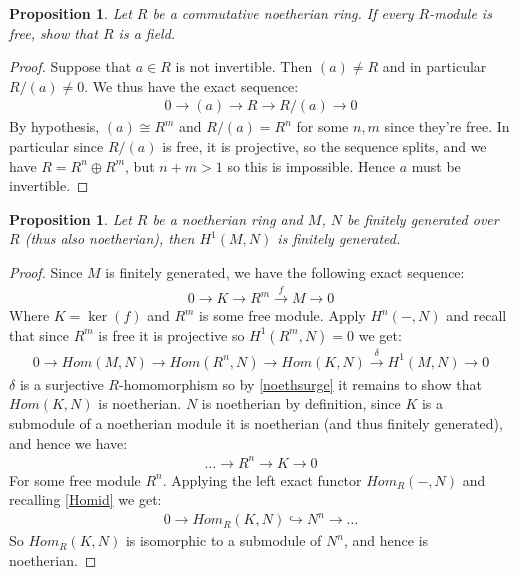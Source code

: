 \documentclass[12pt]{book}
\newtheorem{proposition}[theorem]{Proposition}
\theoremstyle{definition}
\begin{document}
\begin{proposition}
    Let $R$ be a commutative noetherian ring. If every $R$-module is free, show that $R$ is a field. 
\end{proposition}
\begin{proof}
    Suppose that $a \in R$ is not invertible. Then $(a) \neq R$ and in particular $R/(a) \neq 0$. We thus have the exact sequence: 
    \begin{align*}
        0 \rightarrow (a) \rightarrow R \rightarrow R/(a) \rightarrow 0 
    \end{align*}
    By hypothesis, $(a) \cong R^m$ and $R/(a) = R^n$ for some $n, m$ since they're free. In particular since $R/(a)$ is free, it is projective, so the sequence splits, and we have $R = R^n \oplus R^m$, but $n + m > 1$ so this is impossible. Hence $a$ must be invertible. 
\end{proof}

\begin{proposition}
    Let $R$ be a noetherian ring and $M$, $N$ be finitely generated over $R$ (thus also noetherian), then $H^1(M,N)$ is finitely generated.
\end{proposition}
\begin{proof}
    Since $M$ is finitely generated, we have the following exact sequence: 
    \begin{align*}
        0 \rightarrow K \rightarrow R^m \xrightarrow{f} M \rightarrow 0 
    \end{align*}
    Where $K = \ker (f)$ and $R^m$ is some free module. Apply $H^n(-, N)$ and recall that since $R^m$ is free it is projective so $H^1(R^m, N) = 0$ we get: 
    \begin{align*}
        0 \rightarrow Hom(M,N) \rightarrow Hom(R^n, N) \rightarrow Hom(K,N) \xrightarrow{\delta} H^1(M,N) \rightarrow 0
    \end{align*}
    $\delta$ is a surjective $R$-homomorphism so by \ref{noethsurge} it remains to show that $Hom(K,N)$ is noetherian. $N$ is noetherian by definition, since $K$ is a submodule of a noetherian module it is noetherian (and thus finitely generated), and hence we have: 
    \begin{align*}
        \dots \rightarrow R^n \rightarrow K \rightarrow 0 
    \end{align*}
    For some free module $R^n$. Applying the left exact functor $Hom_R(-, N)$ and recalling \ref{Homid} we get: 
    \begin{align*}
        0 \rightarrow Hom_R(K,N) \hookrightarrow N^n \rightarrow \dots 
    \end{align*}
    So $Hom_R(K,N)$ is isomorphic to a submodule of $N^n$, and hence is noetherian. 
\end{proof}
\end{document}
